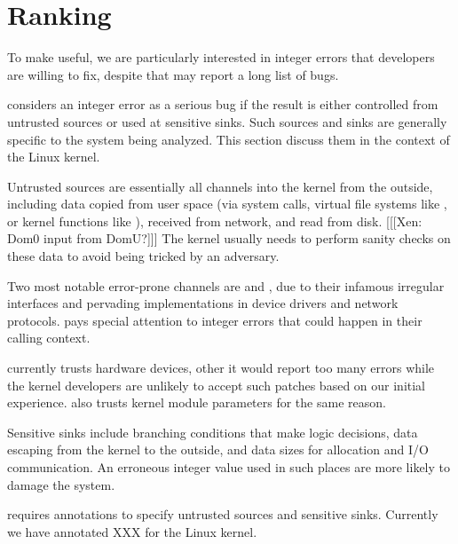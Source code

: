 \section{Ranking}

To make \sys useful, we are particularly interested in integer
errors that developers are willing to fix, despite that \sys may
report a long list of bugs.

\sys considers an integer error as a serious bug if the result is
either controlled from untrusted sources or used at sensitive sinks.
Such sources and sinks are generally specific to the system being
analyzed.  This section discuss them in the context of the Linux
kernel.

Untrusted sources are essentially all channels into the kernel from
the outside, including data copied from user space (via system
calls, virtual file systems like , or kernel functions
like ), received from network, and read from
disk. [[[Xen: Dom0 input from DomU?]]]
The kernel usually needs to perform sanity checks on these data to
avoid being tricked by an adversary.

Two most notable error-prone channels are  and ,
due to their infamous irregular interfaces and pervading implementations
in device drivers and network protocols.  \sys pays special attention
to integer errors that could happen in their calling context.

\sys currently trusts hardware devices, other it would report too
many errors while the kernel developers are unlikely to accept such
patches based on our initial experience.  \sys also trusts kernel
module parameters for the same reason.

Sensitive sinks include branching conditions that make logic
decisions, data escaping from the kernel to the outside, and data
sizes for allocation and I/O communication.  An erroneous integer
value used in such places are more likely to damage the system.

\sys requires annotations to specify untrusted sources and sensitive
sinks.  Currently we have annotated XXX for the Linux kernel.
